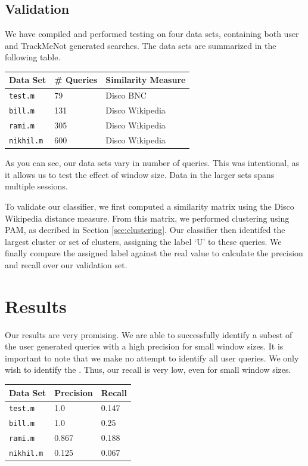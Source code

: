 \documentclass[11pt]{article}
\begin{document}
\begin{multicols}{2}
\subsection{Validation}
We have compiled and performed testing on four data sets, containing
both user and TrackMeNot generated searches. The data sets are
summarized in the following table.

\bigskip
\begin{centering}
    \begin{tabular}{ | l | l | l |}
    \hline
    {\bf Data Set} & {\bf \# Queries} & {\bf Similarity Measure} \\ \hline
    \texttt{test.m} & 79 & Disco BNC \\ \hline
    \texttt{bill.m} & 131 & Disco Wikipedia \\ \hline
    \texttt{rami.m} & 305 & Disco Wikipedia \\ \hline
    \texttt{nikhil.m} & 600 & Disco Wikipedia \\ \hline
    \end{tabular}
\end{centering}
\bigskip

As you can see, our data sets vary in number of queries. This was
intentional, as it allows us to test the effect of window size. Data
in the larger sets spans multiple sessions.

To validate our classifier, we first computed a similarity matrix
using the Disco Wikipedia distance measure. From this matrix, we
performed clustering using PAM, as decribed in Section
\ref{sec:clustering}. Our classifier then identifed the largest
cluster or set of clusters, assigning the label `U' to these
queries. We finally compare the assigned label against the real value
to calculate the precision and recall over our validation set.

\section{Results}
\label{sec:results}

Our results are very promising. We are able to successfully identify a
subest of the user generated queries with a high precision for small
window sizes. It is important to note that we make no attempt to
identify all user queries. We only wish to identify the . Thus, our recall is very low, even for small window sizes.

\bigskip
\begin{centering}
    \begin{tabular}{ | l | l | l |}
    \hline
    {\bf Data Set} & {\bf Precision} & {\bf Recall} \\ \hline
    \texttt{test.m} & 1.0 & 0.147 \\ \hline
    \texttt{bill.m} & 1.0 & 0.25 \\ \hline
    \texttt{rami.m} & 0.867 & 0.188 \\ \hline
    \texttt{nikhil.m} & 0.125 & 0.067 \\ \hline
    \end{tabular}
\end{centering}
\bigskip



\end{multicols}
\end{document}
